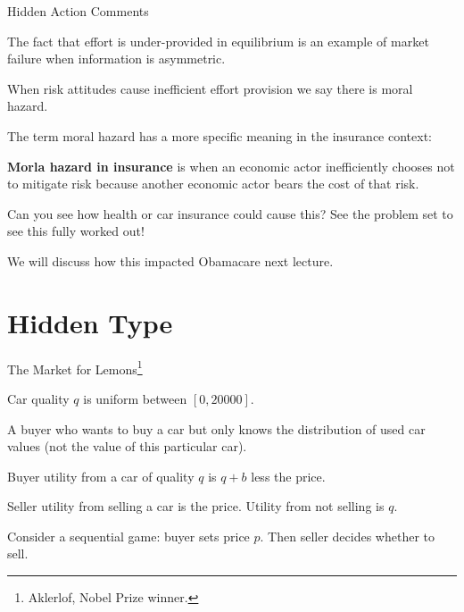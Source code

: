 \documentclass[aspectratio=169]{beamer}
\newenvironment{wideitemize}{\itemize\addtolength{\itemsep}{10pt}}{\enditemize}
\begin{document}
\begin{frame}{Hidden Action Comments}

\begin{wideitemize}
    \item The fact that effort is under-provided in equilibrium is an example of market failure when information is asymmetric.
    \item When risk attitudes cause inefficient effort provision we say there is moral hazard.
    \item The term moral hazard has a more specific meaning in the insurance context:
    
    \begin{definition}
    \textbf{Morla hazard in insurance } is when an economic actor inefficiently chooses not to mitigate risk because another economic actor bears the cost of that risk.
    \end{definition}
    \item  Can you see how health or car insurance could cause this? See the problem set to see this fully worked out!
    \item We will discuss how this impacted Obamacare next lecture.
\end{wideitemize}
    
\end{frame}

\section{Hidden Type}

\begin{frame}{The Market for Lemons\footnote{Aklerlof, Nobel Prize winner.}}

\begin{wideitemize}
    \item Car quality $q$ is uniform between $[0,20000]$.
    \item A buyer who wants to buy a car but only knows the distribution of used car values (not the value of this particular car).
    \item Buyer utility from a car of quality $q$ is $q+b$ less the price.
    \item Seller utility from selling a car is the price. Utility from not selling is $q$.
    \item Consider a sequential game: buyer sets price $p$. Then seller decides whether to sell.
\end{wideitemize}
\end{frame}
\end{document}

